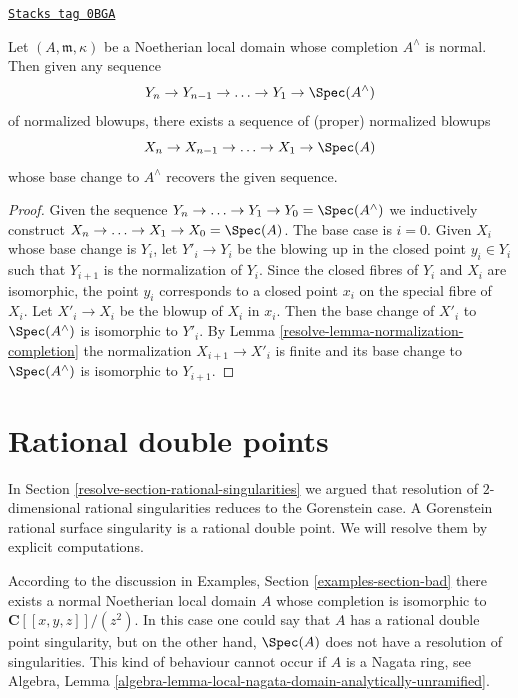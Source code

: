 \begin{lemma}
\label{resolve-lemma-normalized-blowup-completion}
\href{https://stacks.math.columbia.edu/tag/0BGA}{\texttt{Stacks tag 0BGA}}

Let $(A, \mathfrak m, \kappa)$ be a Noetherian local domain whose completion
$A^\wedge$ is normal. Then given any sequence
$$
Y_n \to Y_{n - 1} \to \ldots \to Y_1 \to \Spec(A^\wedge)
$$
of normalized blowups, there exists a sequence of (proper) normalized blowups
$$
X_n \to X_{n - 1} \to \ldots \to X_1 \to \Spec(A)
$$
whose base change to $A^\wedge$ recovers the given sequence.
\end{lemma}

\begin{proof}

Given the sequence $Y_n \to \ldots \to Y_1 \to Y_0 = \Spec(A^\wedge)$ we
inductively construct $X_n \to \ldots \to X_1 \to X_0 = \Spec(A)$.
The base case is $i = 0$. Given $X_i$ whose base change is $Y_i$,
let $Y'_i \to Y_i$ be the blowing up in the closed point $y_i \in Y_i$
such that $Y_{i + 1}$ is the normalization of $Y_i$.
Since the closed fibres of $Y_i$ and $X_i$ are isomorphic, the point
$y_i$ corresponds to a closed point $x_i$ on the special fibre of $X_i$.
Let $X'_i \to X_i$ be the blowup of $X_i$ in $x_i$. Then the base change
of $X'_i$ to $\Spec(A^\wedge)$ is isomorphic to $Y'_i$.
By Lemma \ref{resolve-lemma-normalization-completion}
the normalization $X_{i + 1} \to X'_i$ is finite and its base change
to $\Spec(A^\wedge)$ is isomorphic to $Y_{i + 1}$.
\end{proof}

\section{Rational double points}
\label{resolve-section-rational-double-points}
In Section \ref{resolve-section-rational-singularities}
we argued that resolution of $2$-dimensional
rational singularities reduces to the Gorenstein case.
A Gorenstein rational surface singularity is a rational double point.
We will resolve them by explicit computations.

\medskip\noindent
According to the discussion in Examples, Section \ref{examples-section-bad}
there exists a normal Noetherian local domain $A$ whose completion
is isomorphic to $\mathbf{C}[[x, y, z]]/(z^2)$. In this case one could
say that $A$ has a rational double point singularity, but on the other
hand, $\Spec(A)$ does not have a resolution of singularities.
This kind of behaviour cannot occur if $A$ is a Nagata ring, see
Algebra, Lemma \ref{algebra-lemma-local-nagata-domain-analytically-unramified}.

